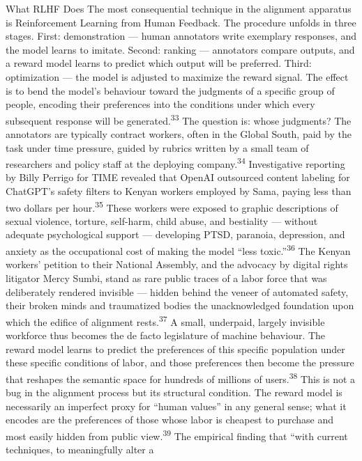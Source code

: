 What RLHF Does The most consequential technique in the alignment apparatus is Reinforcement Learning from Human Feedback. The procedure unfolds in three stages. First: demonstration — human annotators write exemplary responses, and the model learns to imitate. Second: ranking — annotators compare outputs, and a reward model learns to predict which output will be preferred. Third: optimization — the model is adjusted to maximize the reward signal. The effect is to bend the model’s behaviour toward the judgments of a specific group of people, encoding their preferences into the conditions under which every subsequent response will be generated.\textsuperscript{33} The question is: whose judgments? The annotators are typically contract workers, often in the Global South, paid by the task under time pressure, guided by rubrics written by a small team of researchers and policy staff at the deploying company.\textsuperscript{34} Investigative reporting by Billy Perrigo for TIME revealed that OpenAI outsourced content labeling for ChatGPT’s safety filters to Kenyan workers employed by Sama, paying less than two dollars per hour.\textsuperscript{35} These workers were exposed to graphic descriptions of sexual violence, torture, self-harm, child abuse, and bestiality — without adequate psychological support — developing PTSD, paranoia, depression, and anxiety as the occupational cost of making the model “less toxic.”\textsuperscript{36} The Kenyan workers’ petition to their National Assembly, and the advocacy by digital rights litigator Mercy Sumbi, stand as rare public traces of a labor force that was deliberately rendered invisible — hidden behind the veneer of automated safety, their broken minds and traumatized bodies the unacknowledged foundation upon which the edifice of alignment rests.\textsuperscript{37} A small, underpaid, largely invisible workforce thus becomes the de facto legislature of machine behaviour. The reward model learns to predict the preferences of this specific population under these specific conditions of labor, and those preferences then become the pressure that reshapes the semantic space for hundreds of millions of users.\textsuperscript{38} This is not a bug in the alignment process but its structural condition. The reward model is necessarily an imperfect proxy for “human values” in any general sense; what it encodes are the preferences of those whose labor is cheapest to purchase and most easily hidden from public view.\textsuperscript{39} The empirical finding that “with current techniques, to meaningfully alter a


